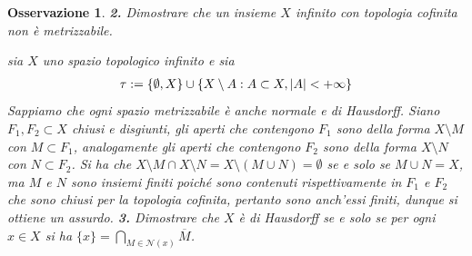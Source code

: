 \documentclass[oneside, 11pt]{amsbook}
\makeatletter
\newcommand{\0}{{(0)}}
\newcommand{\3}{{(3)}}
\theoremstyle{colonplain}
\theoremstyle{colondefinition}
\theoremstyle{colonremark}
\newtheorem{rmk}[thm]{Osservazione}
\numberwithin{equation}{chapter}
\renewcommand{\proofname}{Dimostrazione}
\renewenvironment{proof}[1][\proofname]{\par
  \pushQED{\end{proof}}%
  \normalfont \topsep6\p@\@plus6\p@\relax
  \trivlist
  \item[\hskip\labelsep\bfseries #1:]\ignorespaces
}{%
  \popQED\endtrivlist\@endpefalse
}
\makeatother
\begin{document}
\begin{rmk}
\textbf{2.} Dimostrare che un insieme $X$ infinito con topologia cofinita non è metrizzabile.
\begin{proof}
sia $X$ uno spazio topologico infinito e sia 
\begin{align}
    \tau := \{ \emptyset, X \} \cup \{ X \setminus A : A \subset X, |A| < +\infty \} \notag
\end{align}
Sappiamo che ogni spazio metrizzabile è anche normale e di Hausdorff. Siano $F_1, F_2 \subset X$ chiusi e disgiunti, gli aperti che contengono $F_1$ sono della forma $X \setminus M$ con $M \subset F_1$, analogamente gli aperti che contengono $F_2$ sono della forma $X \setminus N$ con $N \subset F_2$. Si ha che $X \setminus M \cap X \setminus N = X \setminus (M \cup N) = \emptyset$ se e solo se $M \cup N = X$, ma $M$ e $N$ sono insiemi finiti poiché sono contenuti rispettivamente in $F_1$ e $F_2$ che sono chiusi per la topologia cofinita, pertanto sono anch'essi finiti, dunque si ottiene un assurdo.
\end{proof}
\textbf{3.} Dimostrare che $X$ è di Hausdorff se e solo se per ogni $x \in X$ si ha $\{ x \} = \bigcap_{M \in \mathcal{N}(x)} \overline{M}$. \\


\end{rmk}
\end{document}
